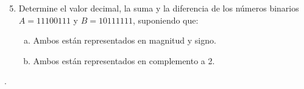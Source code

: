 \documentclass[
	spanish,
	8pt,
	utf8,
	xcolor=table,
	handout,
	aspectratio=169,
	professionalfonts,
	mathserif,
	leqno,
]{beamer}
\begin{document}
\begin{frame}
	\begin{enumerate}\setcounter{enumi}{4}
		\item

		      Determine el valor decimal, la suma y la diferencia de los
		      números binarios $A=11100111$ y $B=10111111$, suponiendo
		      que:

		      \begin{multicols}{2}

			      \begin{enumerate}[a)]
				      \item

				            Ambos están representados en magnitud y signo.

				      \item

				            Ambos están representados en complemento a 2.
			      \end{enumerate}
		      \end{multicols}
	\end{enumerate}

	\begin{solution}
		.
	\end{solution}
\end{frame}






\end{document}
